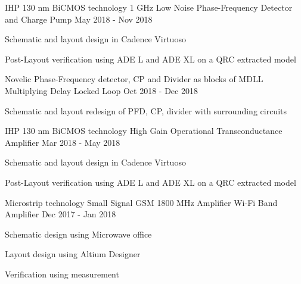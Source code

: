 \begin{cventries}

\cventry
{IHP 130 nm BiCMOS technology} %
{1 GHz Low Noise Phase-Frequency Detector and Charge Pump} %
{} %
{May 2018 - Nov 2018} %
{ %
\begin{cvitems}
\item {Schematic and layout design in Cadence Virtuoso}
\item {Post-Layout verification using ADE L and ADE XL on a QRC extracted model}
\end{cvitems}
}



\cventry
{Novelic} %
{Phase-Frequency detector, CP and Divider as blocks of MDLL} %
{Multiplying Delay Locked Loop} %
{Oct 2018 - Dec 2018} %
{ %
\begin{cvitems}
\item {Schematic and layout redesign of PFD, CP, divider with surrounding circuits}
\end{cvitems}
}






\cventry
{IHP 130 nm BiCMOS technology} %
{High Gain Operational Transconductance Amplifier} %
{} %
{Mar 2018 - May 2018} %
{ %
\begin{cvitems}
\item {Schematic and layout design in Cadence Virtuoso}
\item {Post-Layout verification using ADE L and ADE XL on a QRC extracted model}
\end{cvitems}
}


\cventry
{Microstrip technology} %
{Small Signal GSM 1800 MHz Amplifier} %
{Wi-Fi Band Amplifier} %
{Dec 2017 - Jan 2018} %
{ %
\begin{cvitems}
\item {Schematic design using Microwave office}
\item {Layout design using Altium Designer}
\item {Verification using measurement}
\end{cvitems}
}


\end{cventries}
